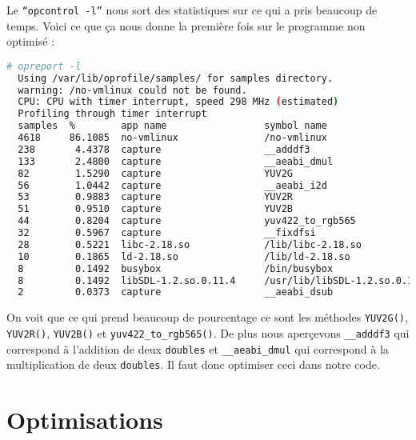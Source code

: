 Le \texttt{``opcontrol -l''} nous sort des statistiques sur ce qui a pris beaucoup de temps. Voici ce que ça nous donne la première fois sur le programme non optimisé :

\begin{lstlisting}[language=bash]
  # opreport -l                                                                   
  Using /var/lib/oprofile/samples/ for samples directory.                         
  warning: /no-vmlinux could not be found.                                        
  CPU: CPU with timer interrupt, speed 298 MHz (estimated)                        
  Profiling through timer interrupt                                               
  samples  %        app name                 symbol name                          
  4618     86.1085  no-vmlinux               /no-vmlinux                          
  238       4.4378  capture                  __adddf3                             
  133       2.4800  capture                  __aeabi_dmul                         
  82        1.5290  capture                  YUV2G                                
  56        1.0442  capture                  __aeabi_i2d                          
  53        0.9883  capture                  YUV2R                                
  51        0.9510  capture                  YUV2B                                
  44        0.8204  capture                  yuv422_to_rgb565                     
  32        0.5967  capture                  __fixdfsi                            
  28        0.5221  libc-2.18.so             /lib/libc-2.18.so                    
  10        0.1865  ld-2.18.so               /lib/ld-2.18.so                      
  8         0.1492  busybox                  /bin/busybox                         
  8         0.1492  libSDL-1.2.so.0.11.4     /usr/lib/libSDL-1.2.so.0.11.4        
  2         0.0373  capture                  __aeabi_dsub
\end{lstlisting}

On voit que ce qui prend beaucoup de pourcentage ce sont les méthodes \texttt{YUV2G()}, \texttt{YUV2R()}, \texttt{YUV2B()} et \texttt{yuv422\_to\_rgb565()}. De plus nous aperçevons \texttt{\_\_adddf3} qui correspond à l'addition de deux \texttt{doubles} et \texttt{\_\_aeabi\_dmul} qui correspond à la multiplication de deux \texttt{doubles}. Il faut donc optimiser ceci dans notre code.

\newpage
\section{Optimisations}


